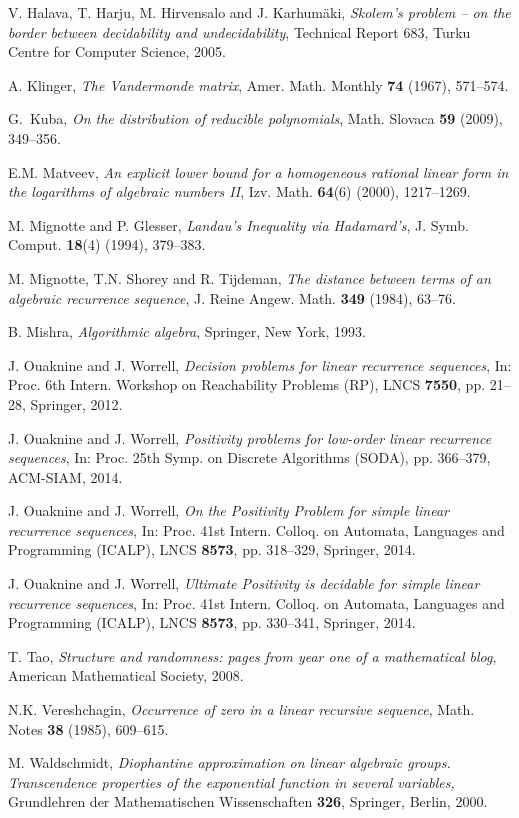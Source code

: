 \documentclass[12pt]{amsart}
\theoremstyle{definition}
\theoremstyle{remark}
\numberwithin{equation}{section}
\begin{document}
\begin{thebibliography}{99}
V. Halava, T. Harju, M. Hirvensalo and J. Karhum\"aki, \textit{Skolem's problem -- on the border between decidability and undecidability}, Technical  Report 683, Turku Centre for Computer Science, 2005.

A. Klinger, \emph{The Vandermonde matrix}, Amer. Math. Monthly \textbf{74} (1967), 571--574.

G.~Kuba, \emph{On the distribution of reducible polynomials}, Math. Slovaca {\bf 59} (2009), 349--356.

E.M. Matveev, \textit{An explicit lower bound for a homogeneous rational linear form in the logarithms of algebraic numbers II}, Izv. Math. \textbf{64}(6) (2000), 1217--1269.

M. Mignotte and P. Glesser, \emph{Landau's Inequality via Hadamard's}, J. Symb. Comput. \textbf{18}(4) (1994), 379--383.

M. Mignotte, T.N. Shorey and R. Tijdeman, \textit{The distance between terms of an algebraic recurrence sequence}, J. Reine Angew. Math. \textbf{349} (1984), 63--76.

B. Mishra, \textit{Algorithmic algebra}, Springer, New York, 1993.

J. Ouaknine and J. Worrell, \textit{Decision problems for linear recurrence sequences}, In:
Proc. 6th Intern. Workshop on Reachability Problems (RP), LNCS \textbf{7550}, pp. 21--28, Springer, 2012.

 J. Ouaknine and J. Worrell, \textit{Positivity problems for low-order linear recurrence sequences}, In:  Proc. 25th Symp. on Discrete Algorithms (SODA), pp. 366--379, ACM-SIAM, 2014. 

J. Ouaknine and J. Worrell, \textit{On the Positivity Problem for simple linear recurrence sequences},
In: Proc. 41st Intern. Colloq. on Automata, Languages and Programming (ICALP), LNCS \textbf{8573}, pp. 318--329, Springer, 2014. 

J. Ouaknine and J. Worrell, \textit{Ultimate Positivity is decidable for simple linear recurrence sequences}, In: Proc. 41st Intern. Colloq. on Automata, Languages and Programming (ICALP), LNCS \textbf{8573}, pp. 330--341, Springer, 2014. 

T. Tao, \textit{Structure and randomness: pages from year one of a mathematical blog}, American Mathematical Society, 2008.

N.K. Vereshchagin, \textit{Occurrence of zero in a linear recursive sequence}, Math. Notes \textbf{38} (1985), 609--615.

M. Waldschmidt, \emph{Diophantine approximation on linear algebraic groups. Transcendence properties of the exponential function in several variables,} Grundlehren der Mathematischen Wissenschaften \textbf{326}, Springer, Berlin, 2000.

\end{thebibliography}
\end{document}
